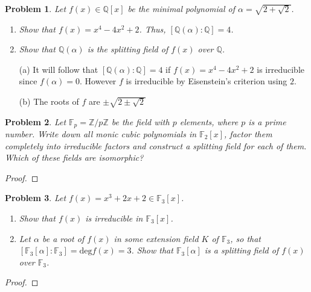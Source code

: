 \documentclass[10pt]{article}
\newcommand{\sk}{\vskip 10mm}
\newcommand{\bb}[1]{\mathbb{#1}}
\theoremstyle{plain}
\newtheorem{problem}{Problem}
\theoremstyle{remark}
\begin{document}
\begin{problem}
  Let $f(x) \in \mathbb{Q}[x]$ be the minimal polynomial of $\alpha = \sqrt{2 + \sqrt{2}}$.
\begin{enumerate}
    \item Show that $f(x) = x^4 - 4x^2 + 2$. Thus, $[\mathbb{Q}(\alpha): \mathbb{Q}] = 4$.
    \item Show that $\mathbb{Q}(\alpha)$ is the splitting field of $f(x)$ over $\mathbb{Q}$.
\end{enumerate}
\end{problem}

\begin{itemize}
\item[(a)] It will follow that $[\bb{Q}(\alpha):\bb{Q}]=4$ if
  $f(x)=x^4-4x^2+2$ is irreducible since $f(\alpha)=0$. However
  $f$ is irreducible by Eisenstein's criterion using $2$.
\item[(b)] The roots of $f$ are $\pm\sqrt{2\pm\sqrt{2}}$
\end{itemize}

\sk

\begin{problem}
  Let $\mathbb{F}_p = \mathbb{Z}/p\mathbb{Z}$ be the field with $p$
  elements, where $p$ is a prime number. Write down all monic cubic
  polynomials in $\mathbb{F}_2[x]$, factor them completely into
  irreducible factors and construct a splitting field for each
  of them. Which of these fields are isomorphic?
\end{problem}

\begin{proof}
  
\end{proof}

\sk

\begin{problem}
  Let $f(x) = x^3 + 2x + 2 \in \mathbb{F}_3[x]$.
\begin{enumerate}
    \item Show that $f(x)$ is irreducible in $\mathbb{F}_3[x]$.
    \item Let $\alpha$ be a root of $f(x)$ in some extension field $K$
      of $\mathbb{F}_3$, so that
      $[\mathbb{F}_3[\alpha]: \mathbb{F}_3] = \mathrm{deg} f(x) = 3$.
      Show that $\mathbb{F}_3[\alpha]$ is a splitting field of $f(x)$
      over $\mathbb{F}_3$.
\end{enumerate}
\end{problem}

\begin{proof}
  
\end{proof}
\end{document}
